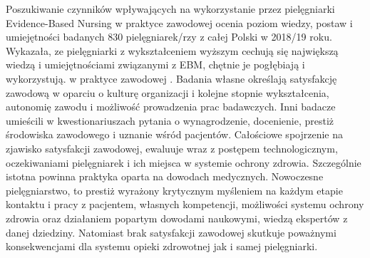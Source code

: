 \documentclass[a4paper,12pt,twoside,openright]{mwrep}
\begin{document}
Poszukiwanie czynników wpływających na wykorzystanie przez pielęgniarki Evidence-Based Nursing w praktyce zawodowej ocenia poziom wiedzy, postaw i umiejętności badanych 830 pielęgniarek/rzy z całej Polski  w 2018/19 roku. Wykazała, ze pielęgniarki z wykształceniem wyższym cechują się największą wiedzą i umiejętnościami związanymi z EBM, chętnie je  pogłębiają i wykorzystują. w praktyce zawodowej \cite{EBM}. Badania własne określają satysfakcję zawodową w oparciu o kulturę organizacji i kolejne stopnie wykształcenia, autonomię zawodu i możliwość prowadzenia prac badawczych. Inni badacze umieścili w kwestionariuszach pytania o wynagrodzenie, docenienie, prestiż środowiska zawodowego i uznanie wśród pacjentów. Całościowe spojrzenie na zjawisko satysfakcji zawodowej, ewaluuje wraz z postępem technologicznym, oczekiwaniami pielęgniarek i ich miejsca w systemie ochrony zdrowia. Szczególnie istotna powinna praktyka oparta na dowodach medycznych. Nowoczesne pielęgniarstwo, to prestiż wyrażony krytycznym myśleniem na każdym etapie kontaktu i pracy z pacjentem, własnych kompetencji, możliwości systemu ochrony zdrowia oraz działaniem popartym dowodami naukowymi, wiedzą ekspertów z danej dziedziny. Natomiast brak satysfakcji zawodowej skutkuje poważnymi konsekwencjami dla systemu opieki zdrowotnej jak i samej pielęgniarki.
\end{document}
